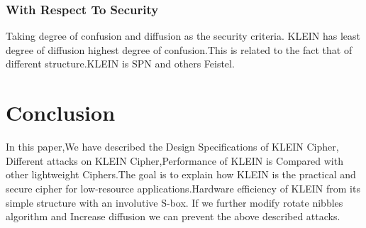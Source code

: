 \documentclass[preprint]{transcrypto}
\begin{document}
\subsubsection{With Respect To Security}
Taking degree of confusion and diffusion as the security criteria. KLEIN has least degree of diffusion
highest degree of confusion.This is related to the fact that of different structure.KLEIN is SPN and others  Feistel.


\section{Conclusion}
In this paper,We have described the Design Specifications of KLEIN Cipher, Different attacks on KLEIN Cipher,Performance of KLEIN is Compared with other lightweight Ciphers.The goal is to explain how KLEIN is the practical and secure cipher for low-resource applications.Hardware efficiency of KLEIN from its simple structure with an involutive S-box. If we further modify rotate nibbles algorithm and Increase diffusion we can prevent the above described attacks.\\


\printbibliography

\end{document}
